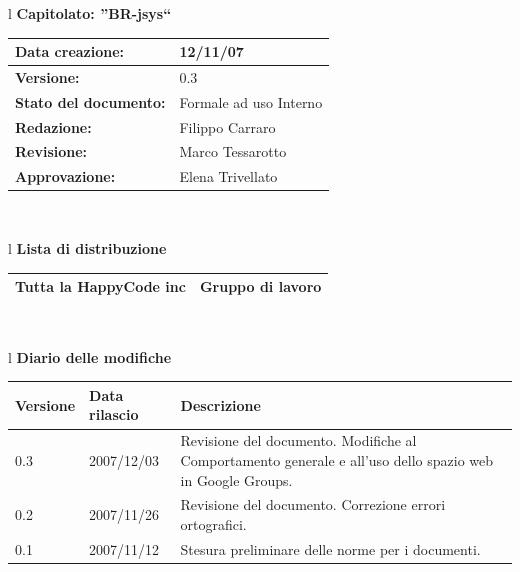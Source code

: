 \documentclass[11pt,titlepage,a4paper]{report}
\begin{document}
\begin{center}
\thispagestyle{plain}
\begin{table}[htbp]
\large{
\begin{tabular}{l}
\Large{\textbf{\textsf{Capitolato: ''BR-jsys``}}} \\
\begin{tabular}{||p{6cm}||p{6cm}||}
\hline
\textbf{Data creazione:} & 12/11/07 \\
\hline
\textbf{Versione:} & 0.3 \\
\hline
\textbf{Stato del documento:} & Formale ad uso Interno \\
\hline
\textbf{Redazione:} & Filippo Carraro \\
\hline
\textbf{Revisione:} & Marco Tessarotto \\
\hline
\textbf{Approvazione:}  & Elena Trivellato\\
\hline
\end{tabular} \\
\end{tabular}
}
\end{table}

\begin{table}[hbtp]
\large{
\begin{tabular}{l}
\Large{\textbf{\textsf{Lista di distribuzione}}} \\
\begin{tabular}{||p{6cm}||p{6cm}||}
\hline
{Tutta la HappyCode inc}& Gruppo di lavoro \\
\hline
\end{tabular} \\
\end{tabular}
}
\end{table}

\begin{table}[hbtp]
\large{
\begin{tabular}{l}
\Large{\textbf{\textsf{Diario delle modifiche}}} \\
\begin{tabular}{||p{2cm}||p{3.5cm}||p{6cm}||}
\hline
\textbf{Versione} & \textbf{Data rilascio} & \textbf{Descrizione} \\
\hline
0.3 & 2007/12/03 & Revisione del documento. Modifiche al Comportamento generale e all'uso dello spazio web in Google Groups. \\
\hline
\hline
0.2 & 2007/11/26 & Revisione del documento. Correzione errori ortografici. \\
\hline
\hline
0.1 & 2007/11/12 & Stesura preliminare delle norme per i documenti. \\
\hline
\end{tabular} \\
\end{tabular}

}
\end{table}
\end{center}
\end{document}
